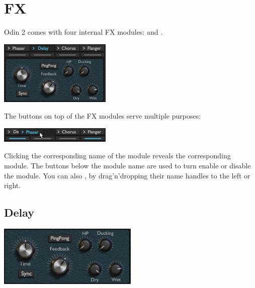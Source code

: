 \chapter{FX}
\label{FX}
Odin 2 comes with four internal FX modules:  and .

\begin{center}
    \includegraphics[width=0.4\textwidth]{graphics/FX.png}
\end{center}

The buttons on top of the FX modules serve multiple purposes:

\begin{center}
    \includegraphics[width=0.4\textwidth]{graphics/FX_selector.png}
\end{center}

Clicking the corresponding name of the module reveals the corresponding module. The buttons below the module name are used to turn enable or disable the module.
You can also , by drag'n'dropping their name handles to the left or right.



\section{Delay}
\label{delay}
\begin{center}
    \includegraphics[width=0.5\textwidth]{graphics/delay.png}
\end{center}

